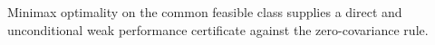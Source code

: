 Minimax optimality on the common feasible class supplies a direct and unconditional weak performance certificate against the zero-covariance rule.